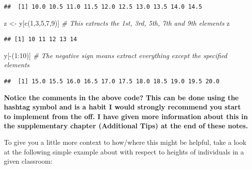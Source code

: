 \documentclass[
]{book}
\newenvironment{Shaded}{\begin{snugshade}}{\end{snugshade}}
\newcommand{\CommentTok}[1]{\textcolor[rgb]{0.56,0.35,0.01}{\textit{#1}}}
\newcommand{\DecValTok}[1]{\textcolor[rgb]{0.00,0.00,0.81}{#1}}
\newcommand{\FunctionTok}[1]{\textcolor[rgb]{0.00,0.00,0.00}{#1}}
\newcommand{\NormalTok}[1]{#1}
\newcommand{\OtherTok}[1]{\textcolor[rgb]{0.56,0.35,0.01}{#1}}
\newcommand{\SpecialCharTok}[1]{\textcolor[rgb]{0.00,0.00,0.00}{#1}}
\theoremstyle{definition}
\theoremstyle{definition}
\theoremstyle{definition}
\theoremstyle{definition}
\theoremstyle{remark}
\begin{document}
\begin{verbatim}
##  [1] 10.0 10.5 11.0 11.5 12.0 12.5 13.0 13.5 14.0 14.5
\end{verbatim}

\begin{Shaded}
\begin{Highlighting}[]
\NormalTok{z }\OtherTok{\textless{}{-}}\NormalTok{ y[}\FunctionTok{c}\NormalTok{(}\DecValTok{1}\NormalTok{,}\DecValTok{3}\NormalTok{,}\DecValTok{5}\NormalTok{,}\DecValTok{7}\NormalTok{,}\DecValTok{9}\NormalTok{)] }\CommentTok{\# This extracts the 1st, 3rd, 5th, 7th and 9th elements}
\NormalTok{z}
\end{Highlighting}
\end{Shaded}

\begin{verbatim}
## [1] 10 11 12 13 14
\end{verbatim}

\begin{Shaded}
\begin{Highlighting}[]
\NormalTok{y[}\SpecialCharTok{{-}}\NormalTok{(}\DecValTok{1}\SpecialCharTok{:}\DecValTok{10}\NormalTok{)] }\CommentTok{\# The negative sign means extract everything except the specified elements}
\end{Highlighting}
\end{Shaded}

\begin{verbatim}
##  [1] 15.0 15.5 16.0 16.5 17.0 17.5 18.0 18.5 19.0 19.5 20.0
\end{verbatim}

\textbf{Notice the comments in the above code? This can be done using the hashtag symbol and is a habit I would strongly recommend you start to implement from the off. I have given more information about this in the supplementary chapter (Additional Tips) at the end of these notes.}

To give you a little more context to how/where this might be helpful, take a look at the following simple example about with respect to heights of individuals in a given classroom:
\end{document}
